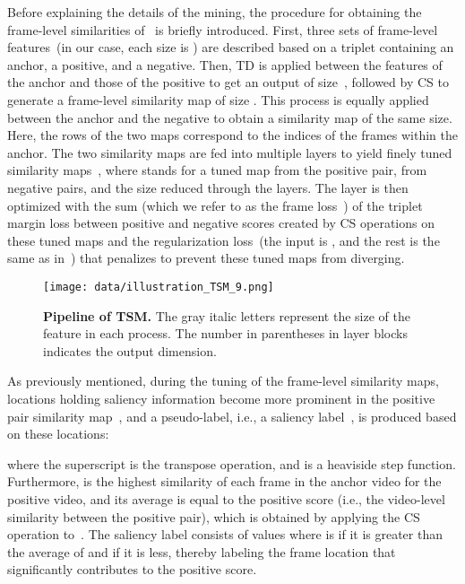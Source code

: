 \documentclass[10pt,twocolumn,letterpaper]{article}
\begin{document}
            Before explaining the details of the mining, the procedure for obtaining the frame-level similarities of~\cite{kordopatis2019visil} is briefly introduced. First, three sets of frame-level features~(in our case, each size is ) are described based on a triplet containing an anchor, a positive, and a negative. Then, TD is applied between the features of the anchor and those of the positive to get an output of size~, followed by CS to generate a frame-level similarity map of size . This process is equally applied between the anchor and the negative to obtain a similarity map of the same size. Here, the rows of the two maps correspond to the indices of the frames within the anchor. The two similarity maps are fed into multiple layers to yield finely tuned similarity maps~, where  stands for a tuned map from the positive pair,  from negative pairs, and  the size reduced through the layers. The layer is then optimized with the sum (which we refer to as the frame loss~) of the triplet margin loss between positive and negative scores created by CS operations on these tuned maps and the regularization loss~(the input is , and the rest is the same as in~\cite{kordopatis2019visil}) that penalizes to prevent these tuned maps from diverging.

        \begin{figure}[t!]
            \centering
            \texttt{[image: data/illustration\_TSM\_9.png]} 
            \vspace{-3mm}
            \caption{\textbf{Pipeline of TSM.} The gray italic letters represent the size of the feature in each process. The number in parentheses in layer blocks indicates the output dimension. \vspace{-4mm}} \label{fig:tsm}
        \end{figure}
        
            As previously mentioned, during the tuning of the frame-level similarity maps, locations holding saliency information become more prominent in the positive pair similarity map~, and a pseudo-label, i.e., a saliency label~, is produced based on these locations:
            {\small
                
            }\noindent where the superscript  is the transpose operation, and  is a heaviside step function. Furthermore,  is the highest similarity of each frame in the anchor video for the positive video, and its average is equal to the positive score (i.e., the video-level similarity between the positive pair), which is obtained by applying the CS operation to~. The saliency label consists of values where  is  if it is greater than the average of  and  if it is less, thereby labeling the frame location that significantly contributes to the positive score.
\end{document}
